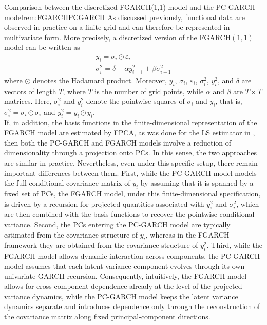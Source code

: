 \documentclass[12pt,a4paper]{article}
\theoremstyle{definition}
\begin{document}
\begin{remark}{Comparison between the discretized FGARCH(1,1) model and the PC-GARCH model}{rem:FGARCHPCGARCH}
    As discussed previously, functional data are observed in practice on a finite grid and can therefore be represented in multivariate form. More precisely, a discretized version of the FGARCH$(1,1)$ model can be written as
    \begin{gather}
        y_i=\sigma_i \odot \varepsilon_i\\
        \sigma_i^2 = \delta+\alpha y_{i-1}^2+\beta\sigma_{i-1}^2
    \end{gather}
    where $\odot$ denotes the Hadamard product. Moreover, $y_i$, $\sigma_i$, $\varepsilon_i$, $\sigma_i^2$, $y_i^2$, and $\delta$ are vectors of length $T$, where $T$ is the number of grid points, while $\alpha$ and $\beta$ are $T \times T$ matrices. Here, $\sigma_i^2$ and $y_i^2$ denote the pointwise squares of $\sigma_i$ and $y_i$, that is, $\sigma_i^2 = \sigma_i \odot \sigma_i$ and $y_i^2 = y_i \odot y_i$.\\
    If, in addition, the basis functions in the finite-dimensional representation of the FGARCH model are estimated by FPCA, as was done for the LS estimator in , then both the PC-GARCH and FGARCH models involve a reduction of dimensionality through a projection onto PCs. In this sense, the two approaches are similar in practice. Nevertheless, even under this specific setup, there remain important differences between them. First, while the PC-GARCH model models the full conditional covariance matrix of $y_i$ by assuming that it is spanned by a fixed set of PCs, the FGARCH model, under this finite-dimensional specification, is driven by a recursion for projected quantities associated with $y_i^2$ and $\sigma_i^2$, which are then combined with the basis functions to recover the pointwise conditional variance. Second, the PCs entering the PC-GARCH model are typically estimated from the covariance structure of $y_i$, whereas in the FGARCH framework they are obtained from the covariance structure of $y_i^2$. Third, while the FGARCH model allows dynamic interaction across components, the PC-GARCH model assumes that each latent variance component evolves through its own univariate GARCH recursion. Consequently, intuitively, the FGARCH model allows for cross-component dependence already at the level of the projected variance dynamics, while the PC-GARCH model keeps the latent variance dynamics separate and introduces dependence only through the reconstruction of the covariance matrix along fixed principal-component directions.
\end{remark}
\end{document}
